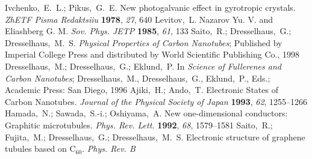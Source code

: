 \documentclass[journal=nalefd,manuscript=article,layout=twocolumn]{achemso}
\begin{document}
\begin{mcitethebibliography}{48}
\mciteSetBstMidEndSepPunct{\mcitedefaultmidpunct}
{\mcitedefaultendpunct}{\mcitedefaultseppunct}\relax
\EndOfBibitem
{}
Ivchenko,~E.~L.; Pikus,~G.~E. New photogalvanic effect in gyrotropic crystals.
  \emph{ZhETF Pisma Redaktsiiu} \textbf{1978}, \emph{27}, 640\relax
\mciteBstWouldAddEndPuncttrue
\mciteSetBstMidEndSepPunct{\mcitedefaultmidpunct}
{\mcitedefaultendpunct}{\mcitedefaultseppunct}\relax
\EndOfBibitem
{}
Levitov,~L. Nazarov Yu. V. and Eliashberg G. M. \emph{Sov. Phys. JETP}
  \textbf{1985}, \emph{61}, 133\relax
\mciteBstWouldAddEndPuncttrue
\mciteSetBstMidEndSepPunct{\mcitedefaultmidpunct}
{\mcitedefaultendpunct}{\mcitedefaultseppunct}\relax
\EndOfBibitem
{}
Saito,~R.; Dresselhaus,~G.; Dresselhaus,~M.~S. \emph{Physical Properties of
  Carbon Nanotubes}; Published by Imperial College Press and distributed by
  World Scientific Publishing Co., 1998\relax
\mciteBstWouldAddEndPuncttrue
\mciteSetBstMidEndSepPunct{\mcitedefaultmidpunct}
{\mcitedefaultendpunct}{\mcitedefaultseppunct}\relax
\EndOfBibitem
{}
Dresselhaus,~M.; Dresselhaus,~G.; Eklund,~P. In \emph{Science of Fullerenes and
  Carbon Nanotubes}; Dresselhaus,~M., Dresselhaus,~G., Eklund,~P., Eds.;
  Academic Press: San Diego, 1996\relax
\mciteBstWouldAddEndPuncttrue
\mciteSetBstMidEndSepPunct{\mcitedefaultmidpunct}
{\mcitedefaultendpunct}{\mcitedefaultseppunct}\relax
\EndOfBibitem
{}
Ajiki,~H.; Ando,~T. Electronic States of Carbon Nanotubes. \emph{Journal of the
  Physical Society of Japan} \textbf{1993}, \emph{62}, 1255--1266\relax
\mciteBstWouldAddEndPuncttrue
\mciteSetBstMidEndSepPunct{\mcitedefaultmidpunct}
{\mcitedefaultendpunct}{\mcitedefaultseppunct}\relax
\EndOfBibitem
{}
Hamada,~N.; Sawada,~S.-i.; Oshiyama,~A. New one-dimensional conductors:
  Graphitic microtubules. \emph{Phys. Rev. Lett.} \textbf{1992}, \emph{68},
  1579--1581\relax
\mciteBstWouldAddEndPuncttrue
\mciteSetBstMidEndSepPunct{\mcitedefaultmidpunct}
{\mcitedefaultendpunct}{\mcitedefaultseppunct}\relax
\EndOfBibitem
{}
Saito,~R.; Fujita,~M.; Dresselhaus,~G.; Dresselhaus,~M.~S. Electronic structure
  of graphene tubules based on ${\mathrm{C}}_{60}$. \emph{Phys. Rev. B}

\end{mcitethebibliography}
\end{document}
